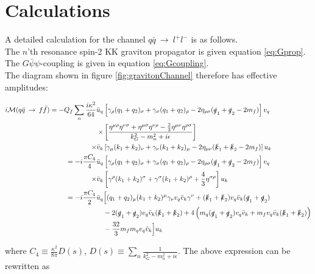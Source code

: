 \documentclass[11pt,a4paper]{article}
\begin{document}
\appendix
\section{Calculations}
A detailed calculation for the channel $q\bar{q}\:\rightarrow\:l^+l^-$ is as follows.\\
The $n$'th resonance spin-2 KK graviton propagator is given equation \ref{eq:Gprop}. The $G\bar{\psi}\psi$-coupling is given in equation \ref{eq:Gcoupling}.\\
The diagram shown in figure \ref{fig:gravitonChannel} therefore has effective amplitudes:

\begin{align}
	\begin{split}
	i\mathcal{M}(q\bar{q}\:\rightarrow\:f\bar{f}) = -Q_f\sum_{n}\frac{i\kappa^2}{64}\bar{u}_q&\left[\gamma_\rho(q_1 + q_2)_\sigma + \gamma_\sigma(q_1+q_2)_\rho - 2\eta_{\rho\sigma}(\slashed q_1 + \slashed q_2 - 2m_f)\right]v_q\\
	\times&\left[\frac{\eta^{\mu\rho}\eta^{\nu\sigma} + \eta^{\mu\sigma}\eta^{\nu\rho} - \frac{2}{3}\eta^{\mu\nu}\eta^{\rho\sigma}}{k_G^2 - m_n^2 + i\epsilon}\right]\\
	\times\bar{v}_k&\left[\gamma_\mu(k_1 + k_2)_\nu + \gamma_\nu(k_1+k_2)_\mu - 2\eta_{\mu\nu}(\slashed k_1 + \slashed k_2 - 2m_f)\right]u_k\\
	= -i\frac{\pi C_4}{4}\bar{u}_q&\left[\gamma_\rho(q_1 + q_2)_ \sigma + \gamma_\sigma(q_1+q_2)_\rho - 2\eta_{\rho\sigma}(\slashed q_1 + \slashed q_2 - 2m_f)\right]v_q\\
	\times\bar{v}_k&\left[\gamma^\rho(k_1 + k_2)^\sigma + \gamma^\sigma(k_1+k_2)^\rho + \frac{4}{3}\eta^{\sigma\rho}\right]u_k\\
	= -i\frac{\pi C_4}{2}\bar{u}_q&\Big[(q_1 + q_2)_ \mu(k_1+k_2)^\mu \gamma_\nu v_q\bar{v}_k\gamma^\nu + (\slashed k_1 + \slashed k_2)v_q\bar{v}_k(\slashed q_1 + \slashed q_2)\\
	&- 2(\slashed q_1 + \slashed q_2)v_q\bar{v}_k(\slashed k_1 + \slashed k_2) + 4\left(m_q(\slashed q_1 + \slashed q_2)v_q\bar{v}_k + m_fv_q\bar{v}_k(\slashed k_1 + \slashed k_2)\right)\\
	&- \frac{32}{3}m_fm_qv_q\bar{v}_k\Big]u_k
	\end{split}
\end{align}

 where $C_4 \equiv \frac{\kappa^2}{8\pi} D(s)$, $D(s) \equiv \sum_{n} \frac{1}{k_G^2 - m_n^2 + i\epsilon}$. The above expression can be rewritten as
\end{document}

